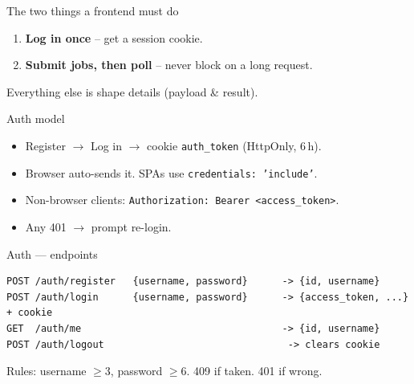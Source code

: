 \documentclass[aspectratio=169,11pt]{beamer}
\newcommand{\hl}[1]{\textcolor{kw}{\textbf{#1}}}
\begin{document}
\begin{frame}{The two things a frontend must do}
  \begin{enumerate}\setlength\itemsep{12pt}
    \item \hl{Log in once} \;--\; get a session cookie.
    \item \hl{Submit jobs, then poll} \;--\; never block on a long request.
  \end{enumerate}
  \vspace{6pt}
  \small Everything else is shape details (payload \& result).
\end{frame}

\begin{frame}{Auth model}
  \begin{itemize}\setlength\itemsep{6pt}
    \item Register \(\rightarrow\) Log in \(\rightarrow\) cookie \texttt{auth\_token} (HttpOnly, 6\,h).
    \item Browser auto-sends it. SPAs use \texttt{credentials: 'include'}.
    \item Non-browser clients: \texttt{Authorization: Bearer <access\_token>}.
    \item Any 401 \(\rightarrow\) prompt re-login.
  \end{itemize}
\end{frame}

\begin{frame}[fragile]{Auth — endpoints}
\begin{lstlisting}[language=shell]
POST /auth/register   {username, password}      -> {id, username}
POST /auth/login      {username, password}      -> {access_token, ...} + cookie
GET  /auth/me                                   -> {id, username}
POST /auth/logout                                -> clears cookie
\end{lstlisting}
\vspace{4pt}
\small Rules: username $\geq$3, password $\geq$6. 409 if taken. 401 if wrong.
\end{frame}
\end{document}
